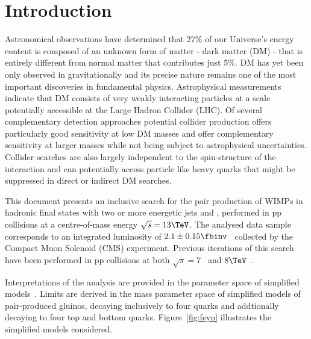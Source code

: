 \section{Introduction}
\label{sec:introduction}


Astronomical observations have determined that 27\% of our Universe’s energy content is composed of an unknown form of matter - dark matter (DM) - that is entirely different from normal matter that contributes just 5\%. DM has yet been only observed in gravitationally and its precise nature remains one of the most important discoveries in fundamental physics. Astrophysical measurements indicate that DM consists of very weakly interacting particles at a scale potentially accessible at the Large Hadron Collider (LHC). Of several complementary detection approaches potential collider production offers particularly good sensitivity at low DM masses and offer complementary sensitivity at larger masses while not being  subject to astrophysical uncertainties. Collider searches are also largely independent to the spin-structure of the interaction and can potentially access particle like heavy quarks that might be suppressed in direct or indirect DM searches.



This document presents an inclusive search for the pair production of WIMPs in hadronic final states with two or more
energetic jets and \met, performed in pp collisions at a centre-of-mass energy $\sqrt{s} = 13\TeV$. The analysed data sample
corresponds to an integrated luminosity of $2.1 \pm 0.15 \fbinv$~\cite{lumi} collected by the Compact Muon Solenoid (CMS)
experiment. Previous iterations of this search have been performed in
pp collisions at both $\sqrt{s} = 7$~\cite{RA1Paper, RA1Paper2011, RA1Paper2011FULL} and $8\TeV$~\cite{RA1Paper2012}.

Interpretations of the analysis are provided in the parameter space of simplified models~\cite{Alwall:2008ag, Alwall:2008va, sms}. Limits are derived in the mass parameter space of simplified models of pair-produced gluinos, decaying inclusively to four quarks and addtionally decaying to four top and bottom quarks. Figure~\ref{fig:feyn} illustrates the simplified models considered.


